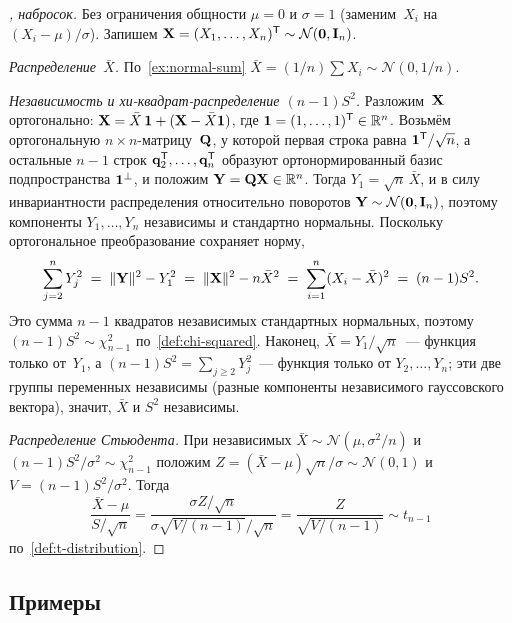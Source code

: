 \begin{proof}[, набросок]
Без ограничения общности $\mu = 0$ и $\sigma = 1$ (заменим~$X_i$ на $(X_i - \mu)/\sigma$). Запишем $\mathbf{X} = (X_1, \dots, X_n)^{\mathsf{T}} \sim \mathcal{N}(\mathbf{0}, \mathbf{I}_n)$.

\emph{Распределение~$\bar X$.} По~\cref{ex:normal-sum} $\bar X = (1/n) \sum X_i \sim \mathcal{N}(0, 1/n)$.

\emph{Независимость и хи-квадрат-распределение $(n-1) S^2$.} Разложим~$\mathbf{X}$ ортогонально: $\mathbf{X} = \bar X\, \mathbf{1} + (\mathbf{X} - \bar X \mathbf{1})$, где $\mathbf{1} = (1, \dots, 1)^{\mathsf{T}} \in \mathbb{R}^n$. Возьмём ортогональную $n \times n$-матрицу~$\mathbf{Q}$, у которой первая строка равна $\mathbf{1}^{\mathsf{T}}/\sqrt n$, а остальные $n - 1$ строк $\mathbf{q}_2^{\mathsf{T}}, \dots, \mathbf{q}_n^{\mathsf{T}}$ образуют ортонормированный базис подпространства $\mathbf{1}^{\perp}$, и положим $\mathbf{Y} = \mathbf{Q} \mathbf{X} \in \mathbb{R}^n$. Тогда $Y_1 = \sqrt n\, \bar X$, и в силу инвариантности распределения относительно поворотов $\mathbf{Y} \sim \mathcal{N}(\mathbf{0}, \mathbf{I}_n)$, поэтому компоненты $Y_1, \dots, Y_n$ независимы и стандартно нормальны. Поскольку ортогональное преобразование сохраняет норму,
\[
  \sum_{j = 2}^{n} Y_j^2 \;=\; \|\mathbf{Y}\|^2 - Y_1^2 \;=\; \|\mathbf{X}\|^2 - n \bar X^2 \;=\; \sum_{i = 1}^{n} (X_i - \bar X)^2 \;=\; (n - 1) S^2.
\]
Это сумма $n - 1$ квадратов независимых стандартных нормальных, поэтому $(n - 1) S^2 \sim \chi^2_{n - 1}$ по~\cref{def:chi-squared}. Наконец, $\bar X = Y_1 / \sqrt n$~--- функция только от~$Y_1$, а $(n - 1) S^2 = \sum_{j \geq 2} Y_j^2$~--- функция только от $Y_2, \dots, Y_n$; эти две группы переменных независимы (разные компоненты независимого гауссовского вектора), значит, $\bar X$ и $S^2$ независимы.

\emph{Распределение Стьюдента.} При независимых $\bar X \sim \mathcal{N}(\mu, \sigma^2/n)$ и $(n-1) S^2 / \sigma^2 \sim \chi^2_{n-1}$ положим $Z = (\bar X - \mu) \sqrt n / \sigma \sim \mathcal{N}(0, 1)$ и $V = (n-1) S^2/\sigma^2$. Тогда
\[
  \frac{\bar X - \mu}{S/\sqrt n} = \frac{\sigma Z/\sqrt n}{\sigma \sqrt{V/(n-1)}/\sqrt n} = \frac{Z}{\sqrt{V/(n-1)}} \sim t_{n - 1}
\]
по~\cref{def:t-distribution}.
\end{proof}

\subsection*{Примеры}

